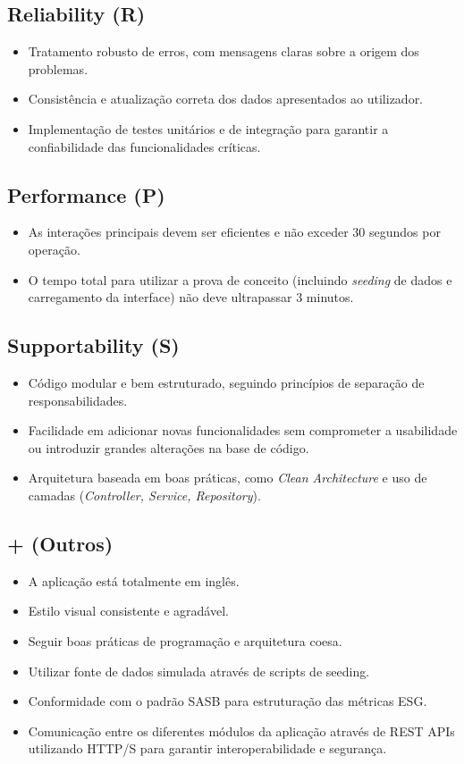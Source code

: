 \subsection{Reliability (R)}
\begin{itemize}
    \item Tratamento robusto de erros, com mensagens claras sobre a origem dos problemas.
    \item Consistência e atualização correta dos dados apresentados ao utilizador.
    \item Implementação de testes unitários e de integração para garantir a confiabilidade das funcionalidades críticas.
\end{itemize}

\subsection{Performance (P)}
\begin{itemize}
    \item As interações principais devem ser eficientes e não exceder 30 segundos por operação.
    \item O tempo total para utilizar a prova de conceito (incluindo \textit{seeding} de dados e carregamento da interface) não deve ultrapassar 3 minutos.
\end{itemize}

\subsection{Supportability (S)}
\begin{itemize}
    \item Código modular e bem estruturado, seguindo princípios de separação de responsabilidades.
    \item Facilidade em adicionar novas funcionalidades sem comprometer a usabilidade ou introduzir grandes alterações na base de código.
    \item Arquitetura baseada em boas práticas, como \textit{Clean Architecture} e uso de camadas (\textit{Controller, Service, Repository}).
\end{itemize}

\subsection{+ (Outros)}
\begin{itemize}
    \item A aplicação está totalmente em inglês.
    \item Estilo visual consistente e agradável.
    \item Seguir boas práticas de programação e arquitetura coesa.
    \item Utilizar fonte de dados simulada através de scripts de seeding.
    \item Conformidade com o padrão \gls{SASB} para estruturação das métricas \gls{ESG}.
    \item Comunicação entre os diferentes módulos da aplicação através de REST APIs utilizando HTTP/S para garantir interoperabilidade e segurança.
\end{itemize}

